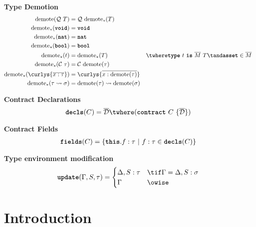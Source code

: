\documentclass[10pt]{article}
\begin{document}
\framebox{$\demote(\tau) = \sigma$}
 \textbf{Type Demotion}
\begin{align*}
    \demote(\mathcal{Q}~T) &= \mathcal{Q}~\demote_*(T) \\
    \demote_*(\voidt) &= \voidt \\
    \demote_*(\natt) &= \natt \\
    \demote_*(\boolt) &= \boolt \\
    \demote_*(t) &= \demote_*(T) & \twhere \type~t~\is~\overline{M}~T \tand \asset \in \overline{M} \\
    \demote_*(\mathcal{C}~\tau) &= \mathcal{C}~\demote(\tau) \\
    \demote_*(\curlys{\overline{x : \tau}}) &= \curlys{\overline{x : \demote(\tau)}} \\
    \demote_*(\tau \transforms \sigma) &= \demote(\tau) \transforms \demote(\sigma)
\end{align*}

 \textbf{Contract Declarations}
\begin{align*}
    \decls(C) = \overline{\mathcal{D}} \twhere (\contract~C~\{ \overline{\mathcal{D}} \})
\end{align*}

 \textbf{Contract Fields}
\begin{align*}
    \textbf{\texttt{fields}}(C) = \left\{ {\textbf{\texttt{this}}.f : \tau} ~|~ {f : \tau \in \textbf{\texttt{decls}}(C)} \right\}
\end{align*}

 \textbf{Type environment modification}
\[
    \update(\Gamma, S, \tau) =
    \begin{cases}
        \Delta, S : \tau & \tif \Gamma = \Delta, S : \sigma \\
        \Gamma & \owise
    \end{cases}
\]



\section{Introduction}
\end{document}
